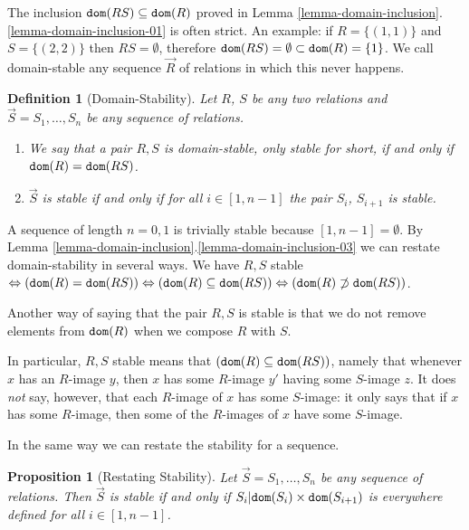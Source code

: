 \documentclass{lmcs}
\newtheorem{proposition}[theorem]{Proposition}
\newtheorem{definition}[theorem]{Definition}
\begin{document}
The inclusion ${\tt dom}(RS) \subseteq {\tt dom}(R)$ proved in
Lemma \ref{lemma-domain-inclusion}.\ref{lemma-domain-inclusion-01}
is often strict. An example: if $R = \{(1,1)\}$ and $S = \{(2,2)\}$ then $RS=\emptyset$,
therefore ${\tt dom}(RS) = \emptyset \subset {\tt dom}(R) = \{1\}$. 
We call domain-stable any sequence $\vec{R}$ of relations in which this never happens.
 
\begin{definition}[Domain-Stability]
Let $R$, $S$ be any two relations and $\vec{S}=S_1, \ldots, S_n$ be any sequence of relations. 
\begin{enumerate}

\item
We say that a pair $R, S$ is \emph{domain-stable}, only \emph{stable} for short, if 
and only if ${\tt dom}(R) = {\tt dom}(RS)$.

\item
$\vec{S}$ is stable if and only if for all $i \in [1,n-1]$
the pair $S_i$, $S_{i+1}$ is stable.

\end{enumerate} 
\end{definition}


A sequence of length $n=0,1$ is trivially stable because $[1,n-1] = \emptyset$.
By Lemma \ref{lemma-domain-inclusion}.\ref{lemma-domain-inclusion-03} we can
restate domain-stability in several ways. We have
$R,S$ stable $ \Leftrightarrow ({\tt dom}(R) = {\tt dom}(RS))  
  \Leftrightarrow  
({\tt dom}(R) \subseteq {\tt dom}(RS)) 
  \Leftrightarrow   
({\tt dom}(R) \not \supset  {\tt dom}(RS))
$.

Another way of saying that the pair $R,S$ is stable is that we do not remove elements
from ${\tt dom}(R)$ when we compose $R$ with $S$.

In particular, $R,S$ stable means that $({\tt dom}(R) \subseteq {\tt dom}(RS))$, 
namely that whenever $x$ has an $R$-image $y$, then $x$ has some
$R$-image $y'$ having some $S$-image $z$. It does \emph{not} say, however,
that each $R$-image of $x$ has some $S$-image: it only says that if $x$ has some
$R$-image, then some of the $R$-images of $x$ have some $S$-image. 

In the same way we can restate the stability for a sequence.

\begin{proposition}[Restating Stability]
Let $\vec{S}=S_1, \ldots, S_n$ be any sequence of relations. 
Then  $\vec{S}$ is stable if and only if $S_i {|} {\tt dom}(S_i) \times {\tt dom}(S_{i+1})$ 
is everywhere defined for all $i \in [1,n-1]$. 
\end{proposition}
\end{document}
